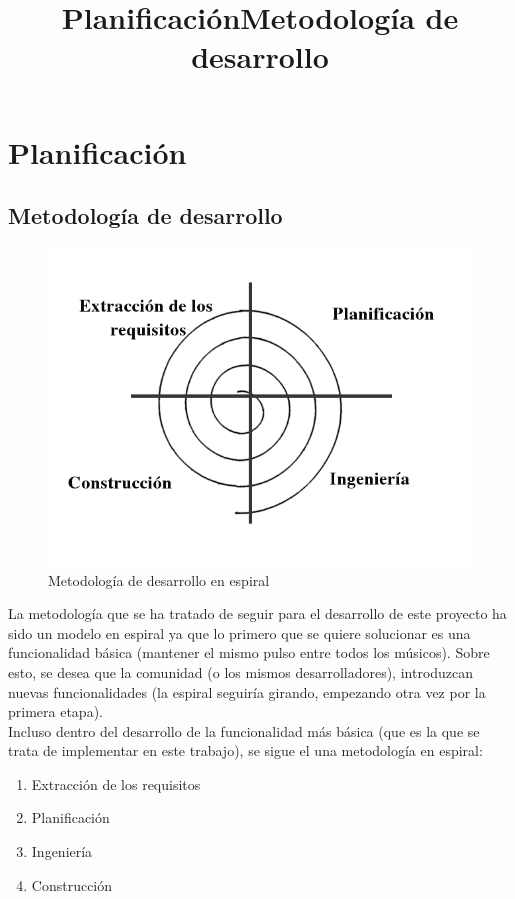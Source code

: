 \chapter{Planificación}
\title{Planificación}

\title{Metodología de desarrollo}
\section{Metodología de desarrollo}

\begin{figure}[htb]
\centering
\includegraphics[width=1\textwidth]{./imagenes/modeloespiral}
\caption{Metodología de desarrollo en espiral} \label{fig:modeloespiral}
\end{figure}

La metodología que se ha tratado de seguir para el desarrollo de este proyecto ha sido
un modelo en espiral ya que lo primero que se quiere solucionar es una funcionalidad
básica (mantener el mismo pulso entre todos los músicos). Sobre esto,
se desea que la comunidad (o los mismos desarrolladores), introduzcan nuevas
funcionalidades (la espiral seguiría girando, empezando otra vez por la primera etapa).\\

Incluso dentro del desarrollo de la funcionalidad más básica (que es
la que se trata de implementar en este trabajo), se sigue el una metodología en espiral:

\begin{enumerate}
  \item Extracción de los requisitos
  \item Planificación
  \item Ingeniería
  \item Construcción
\end{enumerate}



